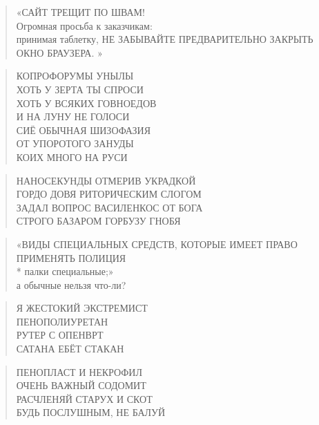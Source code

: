 \poemtitle{***}
\begin{verse}
«САЙТ ТРЕЩИТ ПО ШВАМ!\\
Огромная просьба к заказчикам:\\
принимая таблетку, НЕ ЗАБЫВАЙТЕ ПРЕДВАРИТЕЛЬНО ЗАКРЫТЬ ОКНО БРАУЗЕРА. »
\end{verse}

\poemtitle{***}
\begin{verse}
КОПРОФОРУМЫ УНЫЛЫ\\
ХОТЬ У ЗЕРТА ТЫ СПРОСИ\\
ХОТЬ У ВСЯКИХ ГОВНОЕДОВ\\
И НА ЛУНУ НЕ ГОЛОСИ\\
СИЁ ОБЫЧНАЯ ШИЗОФАЗИЯ\\
ОТ УПОРОТОГО ЗАНУДЫ\\
КОИХ МНОГО НА РУСИ
\end{verse}

\poemtitle{***}
\begin{verse}
НАНОСЕКУНДЫ ОТМЕРИВ УКРАДКОЙ\\
ГОРДО ДОВЯ РИТОРИЧЕСКИМ СЛОГОМ\\
ЗАДАЛ ВОПРОС ВАСИЛЕНКОС ОТ БОГА\\
СТРОГО БАЗАРОМ ГОРБУЗУ ГНОБЯ
\end{verse}

\poemtitle{***}
\begin{verse}
«ВИДЫ СПЕЦИАЛЬНЫХ СРЕДСТВ, КОТОРЫЕ ИМЕЕТ ПРАВО ПРИМЕНЯТЬ ПОЛИЦИЯ\\
* палки специальные;»\\
а обычные нельзя что-ли?
\end{verse}

\poemtitle{***}
\begin{verse}
Я ЖЕСТОКИЙ ЭКСТРЕМИСТ \\
ПЕНОПОЛИУРЕТАН\\
РУТЕР С ОПЕНВРТ\\
САТАНА ЕБЁТ СТАКАН
\end{verse}

\poemtitle{***}
\begin{verse}
ПЕНОПЛАСТ И НЕКРОФИЛ\\
ОЧЕНЬ ВАЖНЫЙ СОДОМИТ\\
РАСЧЛЕНЯЙ СТАРУХ И СКОТ\\
БУДЬ ПОСЛУШНЫМ, НЕ БАЛУЙ
\end{verse}

